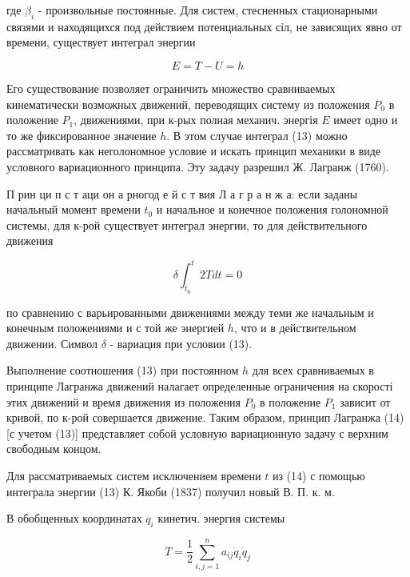 \documentclass[10pt]{article}
\begin{document}
где $\beta_{i}$ - произвольные постоянные. Для систем, стесненных стационарными связями и находящихся под действием потенциальных сіл, не зависящих явно от времени, существует интеграл энергии



\[

E=T-U=h

\]



Его существование позволяет ограничить множество сравниваемых кинематически возможных движений, переводящих систему из положения $P_{0}$ в положение $P_{1}$, движениями, при к-рых полная механич. энергія $E$ имеет одно и то же фиксированное значение $h$. В этом случае интеграл (13) можно рассматривать как неголономное условие и искать принцип механики в виде условного вариационного принципа. Эту задачу разрешил Ж. Лагранж (1760).



П рин ци п с т аци он а рногод е й с т вия Л а г р а н ж а: если заданы начальный момент времени $t_{0}$ и начальное и конечное положения голономной системы, для к-рой существует интеграл энергии, то для действительного движения



\[

\delta \int_{t_{0}}^{t} 2 T d t=0

\]



по сравнению с варьированными движениями между теми же начальным и конечным положениями и с той же энергией $h$, что и в действительном движении. Символ $\delta$ - вариация при условии (13).



Выполнение соотношения (13) при постоянном $h$ для всех сравниваемых в принципе Лагранжа движений налагает определенные ограничения на скорості этих движений и время движения из положения $P_{0}$ в положение $P_{1}$ зависит от кривой, по к-рой совершается движение. Таким образом, принцип Лагранжа (14) [с учетом (13)] представляет собой условную вариационную задачу с верхним свободным концом.



Для рассматриваемых систем исключением времени $t$ из (14) с помощью интеграла энергии (13) К. Якоби (1837) получил новый В. П. к. м.



В обобщенных координатах $q_{i}$ кинетич. энергия системы



\[

T=\frac{1}{2} \sum_{i, j=1}^{n} a_{i j} \dot{q}_{i} \dot{q}_{j}

\]
\end{document}
